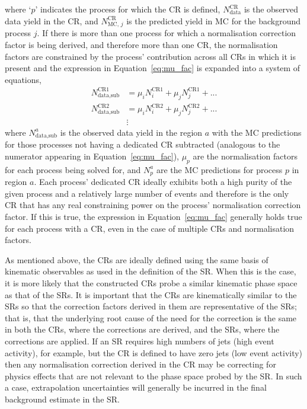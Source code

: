where `$p$' indicates the process for which the CR is defined, $N_{\text{data}}^{\text{CR}}$ is the observed
data yield in the CR, and $N_{\text{MC},\,j}^{\text{CR}}$ is the predicted yield in MC for the background
process $j$.
If there is more than one process for which a normalisation correction factor is being derived, and therefore
more than one CR, the normalisation factors are constrained by the process' contribution across all CRs in which
it is present and the expression in Equation~\ref{eq:mu_fac} is expanded into a system of equations,
\begin{align}
    N_{\text{data,sub}}^{\text{CR1}} &= \mu_i N_i^{\text{CR1}} + \mu_j N_j^{\text{CR1}} + ... \nonumber \\
    N_{\text{data,sub}}^{\text{CR2}} &= \mu_i N_i^{\text{CR2}} + \mu_j N_j^{\text{CR2}} + ...     \label{eq:mu_fac_expand} \\
        &\vdots \nonumber
\end{align}
where $N_{\text{data,sub}}^{a}$ is the observed data yield in the region $a$ with the MC predictions
for those processes not having a dedicated  CR subtracted (analogous to the numerator appearing in Equation~\ref{eq:mu_fac}),
$\mu_p$ are the normalisation factors for each process being solved for, and $N_p^{a}$ are the MC predictions
for process $p$ in region $a$.
Each process' dedicated CR ideally exhibits both a high purity of the given process and a relatively large
number of events and therefore {\color{red}{too large may indicate large extrapolation}}
is the only CR that has any real constraining power on the process' normalisation correction factor.
If this is true, the expression in Equation~\ref{eq:mu_fac} generally holds true for each process with a
CR, even in the case of multiple CRs and
normalisation factors.

As mentioned above, the CRs are ideally defined using the same basis of kinematic observables
as used in the definition of the SR.
When this is the case, it is more likely that the constructed CRs probe a similar kinematic
phase space as that of the SRs.
It is important that the CRs are kinematically similar to the SRs so that the correction factors
derived in them are representative of the SRs; that is, that the underlying root cause of the need for the
correction is the same in both the CRs, where the corrections are derived, and the SRs, where
the corrections are applied.
If an SR requires high numbers of jets (high event activity), for example, but the CR is defined to have zero
jets (low event activity) then any normalisation correction derived in the CR may be correcting for physics effects
that are not relevant to the phase space probed by the SR.
In such a case, extrapolation uncertainties will generally be incurred in the final background estimate in the SR.

